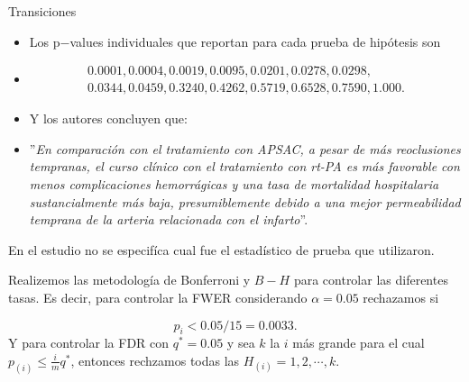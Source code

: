 \begin{frame}{Transiciones}
	\begin{itemize}[<+- | alert@+>]
		
		\item Los p$-$values individuales que reportan para cada prueba de hipótesis son 
		\item[] \begin{align*}
0.0001, 0.0004, 0.0019, 0.0095, 0.0201, 0.0278, 0.0298,\\ 0.0344, 0.0459, 0.3240, 0.4262, 0.5719, 0.6528, 0.7590, 1.000.
\end{align*}

\item Y los autores concluyen que:

\item[] ''\textit{En comparación con el tratamiento con APSAC, a pesar de más reoclusiones tempranas, el curso clínico con el tratamiento con rt-PA es más favorable con menos complicaciones hemorrágicas y una tasa de mortalidad hospitalaria sustancialmente más baja, presumiblemente debido a una mejor permeabilidad temprana de la arteria relacionada con el infarto}''.
	\end{itemize}

\end{frame}

\begin{frame}
    \begin{rr}
    En el estudio no se especifíca cual fue el estadístico de prueba que utilizaron.
    \end{rr}
    Realizemos las metodología de Bonferroni y $B-H$ para controlar las diferentes tasas. Es decir, para controlar la FWER considerando $\alpha=0.05$ rechazamos si
    
    $$p_i<0.05/15=0.0033.$$
    Y para controlar la FDR con $q^*=0.05$ y sea $k$ la $i$ más grande para el cual $p_{(i)}\leq \frac{i}{m}q^*$, entonces rechzamos todas las $H_{(i)}=1,2,\cdots, k.$

\end{frame}


